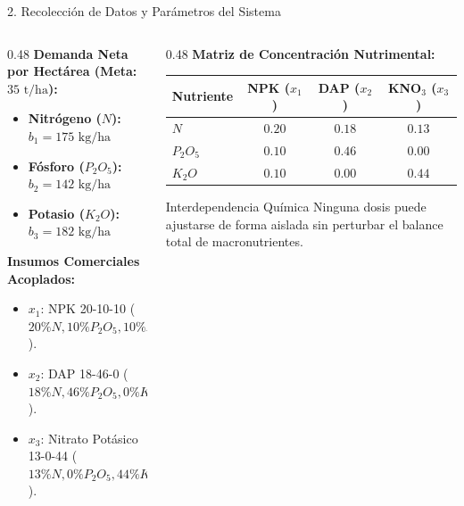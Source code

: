 \documentclass[
  spanish,
  aspectratio=169,
  xcolor={dvipsnames,table}
]{beamer}
\begin{document}
\begin{frame}{2. Recolección de Datos y Parámetros del Sistema}
  \begin{columns}[T]
    \begin{column}{0.48\textwidth}
      \textbf{\color{uanlblue}Demanda Neta por Hectárea (Meta: $35\text{ t/ha}$):}
      \begin{itemize}
        \item \textbf{Nitrógeno ($N$):} $b_1 = 175\text{ kg/ha}$
        \item \textbf{Fósforo ($P_2O_5$):} $b_2 = 142\text{ kg/ha}$
        \item \textbf{Potasio ($K_2O$):} $b_3 = 182\text{ kg/ha}$
      \end{itemize}
      \vspace{0.2cm}
      \textbf{\color{uanlblue}Insumos Comerciales Acoplados:}
      \begin{itemize}
        \item $x_1$: NPK 20-10-10 ($20\% N, 10\% P_2O_5, 10\% K_2O$).
        \item $x_2$: DAP 18-46-0 ($18\% N, 46\% P_2O_5, 0\% K_2O$).
        \item $x_3$: Nitrato Potásico 13-0-44 ($13\% N, 0\% P_2O_5, 44\% K_2O$).
      \end{itemize}
    \end{column}
    \begin{column}{0.48\textwidth}
      \textbf{\color{uanlblue}Matriz de Concentración Nutrimental:}
      \vspace{0.15cm}
      \small
      \begin{tabular}{lccc}
        \toprule
        \textbf{Nutriente} & \textbf{NPK ($x_1$)} & \textbf{DAP ($x_2$)} & \textbf{KNO$_3$ ($x_3$)} \\
        \midrule
        $N$ & $0.20$ & $0.18$ & $0.13$ \\
        $P_2O_5$ & $0.10$ & $0.46$ & $0.00$ \\
        $K_2O$ & $0.10$ & $0.00$ & $0.44$ \\
        \bottomrule
      \end{tabular}
      \vspace{0.3cm}
      \begin{block}{Interdependencia Química}
        Ninguna dosis puede ajustarse de forma aislada sin perturbar el balance total de macronutrientes.
      \end{block}
    \end{column}
  \end{columns}
\end{frame}
\end{document}
